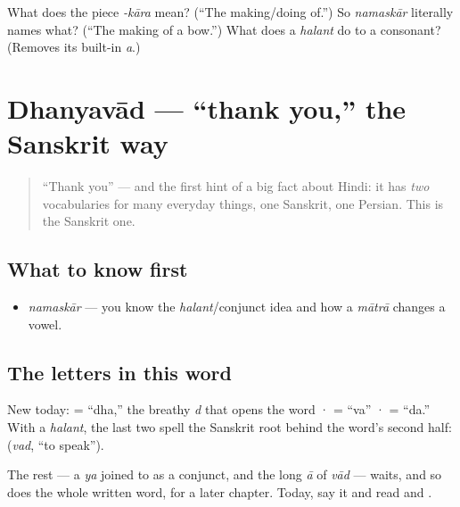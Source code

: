 \begin{tcolorbox}[breakable,colback=teal!4,colframe=teal!35!black,title={Before you move on}]
What does the piece \emph{-kāra} mean? (\textquotedblleft{}The making/doing of.\textquotedblright{}) So \emph{namaskār} literally names what? (\textquotedblleft{}The making of a bow.\textquotedblright{}) What does a \emph{halant} do to a consonant? (Removes its built-in \emph{a}.)
\end{tcolorbox}
\section[\texorpdfstring{\hi{धन्यवाद} (dhanyavād)}{धन्यवाद (dhanyavād)}]{Dhanyavād — \textquotedblleft{}thank you,\textquotedblright{} the Sanskrit way}

\label{lesson:HI-C01-dhanyavad}



\begin{quote}
\textquotedblleft{}Thank you\textquotedblright{} — and the first hint of a big fact about Hindi: it has \emph{two} vocabularies for many everyday things, one Sanskrit, one Persian. This is the Sanskrit one.
\end{quote}

\subsection*{What to know first}
\begin{itemize}
\raggedright
  \item \emph{namaskār} — you know the \emph{halant}/conjunct idea and how a \emph{mātrā} changes a vowel.
\end{itemize}

\subsection*{The letters in this word}
New today: \textbf{} = \textquotedblleft{}dha,\textquotedblright{} the breathy \emph{d} that opens the word · \textbf{} = \textquotedblleft{}va\textquotedblright{} · \textbf{} = \textquotedblleft{}da.\textquotedblright{} With a \emph{halant}, the last two spell the Sanskrit root behind the word's second half: \textbf{} (\emph{vad}, \textquotedblleft{}to speak\textquotedblright{}).

The rest — a \emph{ya} joined to \textbf{} as a conjunct, and the long \emph{ā} of \emph{vād} — waits, and so does the whole written word, for a later chapter. Today, say it and read \textbf{} and \textbf{}.

